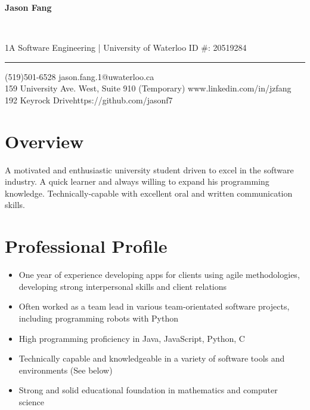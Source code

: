 \documentclass[12pt]{article}
\begin{document}
\thispagestyle{empty}

\begin{center}
\begin{Huge}\textbf{Jason Fang}\end{Huge}\\
\vspace{2pt}
\begin{normalsize}1A Software Engineering | University of Waterloo ID \#: 20519284\end{normalsize} 
\vspace{-10pt}
\end{center}

\rule{475pt}{1pt}
(519)501-6528 \hspace{3.5in} jason.fang.1@uwaterloo.ca\\ 
159 University Ave. West, Suite 910 (Temporary)\hspace{1in} www.linkedin.com/in/jzfang\\
192 Keyrock Drive\hspace{3.2in}https://github.com/jasonf7 \\
\vspace{-24pt}

\section*{Overview} \vspace{-12pt}
A motivated and enthusiastic university student driven to excel in the software industry. A quick learner and always willing to expand his programming knowledge. Technically-capable with excellent oral and written communication skills.
\section*{Professional Profile} \vspace{-12pt}
	\begin{itemize}
	\item One year of experience developing apps for clients using agile methodologies, developing strong interpersonal skills and client relations
	\item Often worked as a team lead in various team-orientated software projects, including programming robots with Python
	\item High programming proficiency in Java, JavaScript, Python, C
	\item Technically capable and knowledgeable in a variety of software tools and environments (See below)
	\item Strong and solid educational foundation in mathematics and computer science
	\end{itemize}
\end{document}
